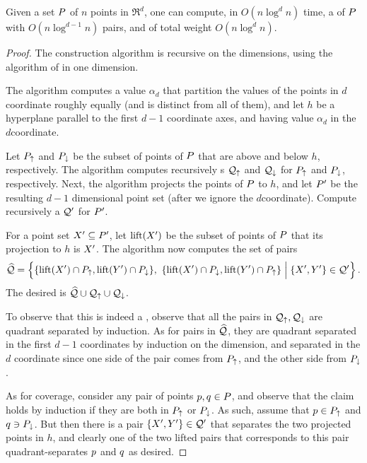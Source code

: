 \documentclass[12pt]{article}%
\begin{document}
\begin{lemma}
    Given a set $P$ of $n$ points in $\Re^d$, one can compute, in
    $O( n \log^d n)$ time, a \QSPD of $P$ with $O(n \log^{d-1} n)$
    pairs, and of total weight $O( n \log^d n)$.
\end{lemma}
\begin{proof}
    The construction algorithm is recursive on the dimensions, using
    the algorithm of  in one dimension.

    The algorithm computes a value $\alpha_d$ that partition the
    values of the points in $d$\th coordinate roughly equally (and is
    distinct from all of them), and let $h$ be a hyperplane parallel
    to the first $d-1$ coordinate axes, and having value $\alpha_d$ in
    the $d$\th coordinate.

    Let $P_{\uparrow}$ and $P_{\downarrow}$ be the subset of
    points of $P$ that are above and below $h$, respectively.  The
    algorithm computes recursively \QSPD{}s $\mathcal{Q}_\uparrow$ and
    $\mathcal{Q}_{\downarrow}$ for $P_\uparrow$ and $P_{\downarrow}$, respectively.  Next,
    the algorithm projects the points of $P$ to $h$, and let $P'$
    be the resulting $d-1$ dimensional point set (after we ignore the
    $d$\th coordinate). Compute recursively a \QSPD $\mathcal{Q}'$ for $P'$.

    
    For a point set $X' \subseteq P'$, let $\liftX{\PSX'}$ be the
    subset of points of $P$ that its projection to $h$ is $X'$.
    The algorithm now computes the set of pairs
    \begin{equation*}
        \widehat{\QS}%
        =%
        \Set{\Bigl.
           \{ \liftX{ \PSX'} \cap \PSup , \liftX{ \PSY' } \cap \PSdown
           \}, \,\,
           \{ \liftX{ \PSX'} \cap \PSdown , \liftX{ \PSY' } \cap \PSup
           \}
        }%
        { \{ \PSX', \PSY' \} \in \QS'}     .
    \end{equation*}
    The desired \QSPD is $\widehat{\mathcal{Q}} \cup \mathcal{Q}_{\uparrow} \cup \mathcal{Q}_{\downarrow}$.

    To observe that this is indeed a \QSPD, observe that all the pairs
    in $\mathcal{Q}_{\uparrow}, \mathcal{Q}_{\downarrow}$ are quadrant separated by induction. As for
    pairs in $\widehat{\mathcal{Q}}$, they are quadrant separated in the first
    $d-1$ coordinates by induction on the dimension, and separated in
    the $d$ coordinate since one side of the pair comes from $P_\uparrow$,
    and the other side from $P_\downarrow$.

    As for coverage, consider any pair of points $p, q \in P$,
    and observe that the claim holds by induction if they are both in
    $P_\uparrow$ or $P_\downarrow$. As such, assume that $p \in P_\uparrow$ and
    $q \ni P_\downarrow$. But then there is a pair
    $\{X', Y'\} \in \mathcal{Q}'$ that separates the two projected
    points in $h$, and clearly one of the two lifted pairs that
    corresponds to this pair quadrant-separates $p$ and $q$ as
    desired.


\end{proof}
\end{document}
